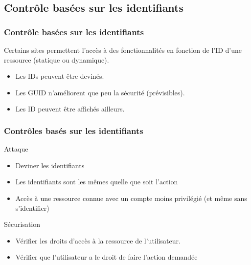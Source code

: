 \documentclass{beamer}
\begin{document}
\subsection{Contrôle basées sur les identifiants}
\begin{frame}
  \frametitle{Contrôle basées sur les identifiants}
  Certains sites permettent l'accès à des fonctionnalités en fonction de l'ID d'une ressource (statique ou dynamique).
  \begin{itemize}
    \item Les IDs peuvent être devinés.
    \item Les GUID n'améliorent que peu la sécurité (prévisibles).
    \item Les ID peuvent être affichés ailleurs.
  \end{itemize}
\end{frame}
\begin{frame}
  \frametitle{Contrôles basés sur les identifiants}
  \begin{alertblock}{Attaque}
    \begin{itemize}
      \item Deviner les identifiants
      \item Les identifiants sont les mêmes quelle que soit l’action
      \item Accès à une ressource connue avec un compte moins privilégié (et même sans s'identifier)
    \end{itemize}
  \end{alertblock}
  \begin{exampleblock}{Sécurisation}
    \begin{itemize}
      \item Vérifier les droits d'accès à la ressource de l'utilisateur.
      \item Vérifier que l'utilisateur a le droit de faire l'action demandée
    \end{itemize}
  \end{exampleblock}
\end{frame}
\end{document}
